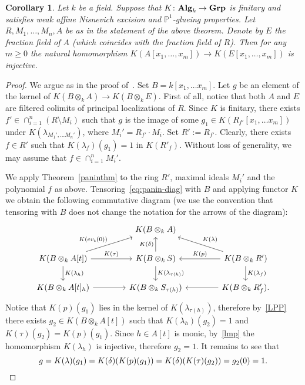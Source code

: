 \documentclass[oneside, 11pt]{amsart} \pdfoutput=1
\numberwithin{equation}{section}
\newtheorem{corollary}[lemma]{Corollary}
\theoremstyle{definition}
\newcommand{\catname}[1]{{\normalfont\textbf{#1}}} %
\begin{document}
\begin{corollary}
\label{esssmooth}
Let $k$ be a field.
Suppose that $K\colon\catname{Alg}_k\rightarrow\catname{Grp}$ is finitary and satisfies weak affine Nisnevich excision and $\mathbb{P}^1$-glueing properties. Let $R, M_1, \ldots, M_n, A$ be as in the statement of the above theorem. Denote by $E$ the fraction field of $A$ {\rm(}which coincides with the fraction field of $R${\rm)}.
Then for any $m\geq 0$ the natural homomorphism $K(A[x_1,\ldots, x_m])\to K(E[x_1,\ldots,x_m])$ is injective.
\end{corollary}
\begin{proof}
We argue as in the proof of~\cite[Theorem~3.2]{Sta20}. Set $B=k[x_1,\ldots x_m]$. Let $g$ be an element of the kernel of $K(B \otimes_k A)\rightarrow K(B \otimes_k E)$. First of all, notice that both $A$ and $E$ are filtered colimits of principal localizations of $R$. Since $K$ is finitary, there exists $f' \in \cap_{i=1}^n(R \setminus M_i)$ such that $g$ is the image of some $g_1 \in K(R_{f'}[x_1,\ldots x_m])$ under $K(\lambda_{M_1',\ldots M_n'})$, where $M_i' = R_{f'} \cdot M_i$. Set $R' := R_{f'}$.
Clearly, there exists $f \in R'$ such that $K(\lambda_{f})(g_1) = 1$ in $K(R'_{f})$. 
Without loss of generality, we may assume that $f \in \cap_{i=1}^n M_i'$. 

We apply Theorem~\ref{paninthm} to the ring $R'$, maximal ideals $M_i'$ and the polynomial $f$ as above.
Tensoring~\eqref{eq:panin-diag} with $B$ and applying functor $K$ we obtain the following commutative diagram (we use the convention that tensoring with $B$ does not change the notation for the arrows of the diagram):
\begin{equation*} 
 \begin{tikzcd}[column sep=4em]
   & K(B \otimes_k A) & \\ 
   K(B \otimes_k A[t]) \ar{d}{K(\lambda_h)} \ar{ru}{K(ev_t(0))} \ar{r}{K(\tau)} & K(B \otimes_k S) \ar{u}{K(\delta)} \ar{d}{K(\lambda_{\tau(h)})}  & K(B \otimes_k R') \ar{ul}[swap]{K(\lambda)} \ar{d}{K(\lambda_f)} \ar{l}[swap]{K(p)} \\
   K(B \otimes_k A[t]_h) \ar{r}[swap]{}              & K(B \otimes_k S_{\tau(h)})      & K(B \otimes_k R'_f). \ar{l}{}\end{tikzcd}
\end{equation*}
Notice that $K(p)(g_1)$ lies in the kernel of $K(\lambda_{\tau(h)})$, therefore by~\ref{LPP} there exists $g_2\in K(B \otimes_k A[t])$ such that $K(\lambda_h)(g_2)=1$ and $K(\tau)(g_2)=K(p)(g_1)$. Since $h \in A[t]$ is monic, by~\cref{lmp} the homomorphism $K(\lambda_h)$ is injective, therefore $g_2=1$. It remains to see that
$$g=K(\lambda)(g_1)=K(\delta)(K(p)(g_1))=K(\delta)(K(\tau)(g_2))=g_2(0)=1.\qedhere$$
\end{proof}
\end{document}
